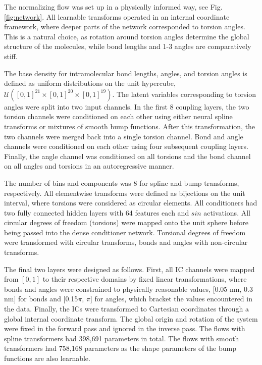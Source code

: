 \documentclass{article}
\begin{document}
The normalizing flow was set up in a physically informed way, see Fig. \ref{fig:network}. All learnable transforms operated in an internal coordinate framework, where deeper parts of the network corresponded to torsion angles. This is a natural choice, as rotation around torsion angles determine the global structure of the molecules, while bond lengths and 1-3 angles are comparatively stiff.

The base density for intramolecular bond lengths, angles, and torsion angles is defined as uniform distributions on the unit hypercube, $\mathcal{U}\left([0,1]^{21} \times [0,1]^{20} \times [0,1]^{19}\right)$. The latent variables corresponding to torsion angles were split into two input channels. In the first 8 coupling layers, the two torsion channels were conditioned on each other using either neural spline transforms or mixtures of smooth bump functions. After this transformation, the two channels were merged back into a single torsion channel. Bond and angle channels were conditioned on each other using four subsequent coupling layers. Finally, the angle channel was conditioned on all torsions and the bond channel on all angles and torsions in an autoregressive manner.

The number of bins and components was 8 for spline and bump transforms, respectively. All elementwise transforms were defined as bijections on the unit interval, where torsions were considered as circular elements. All conditioners had two fully connected hidden layers with 64 features each and $sin$ activations. All circular degrees of freedom (torsions) were mapped onto the unit sphere before being passed into the dense conditioner network. Torsional degrees of freedom were transformed with circular transforms, bonds and angles with non-circular transforms.

The final two layers were designed as follows. First, all IC channels were mapped from $[0,1]$ to their respective domains by fixed linear transformations, where bonds and angles were constrained to physically reasonable values, [0.05 nm, 0.3 nm] for bonds and [0.15$\pi$, $\pi$] for angles, which bracket the values encountered in the data. Finally, the ICs were transformed to Cartesian coordinates through a global internal coordinate transform.
The global origin and rotation of the system were fixed in the forward pass and ignored in the inverse pass. The flows with spline transformers had 398,691 parameters in total. The flows with smooth transformers had 758,168 parameters as the shape parameters of the bump functions are also learnable.
\end{document}
